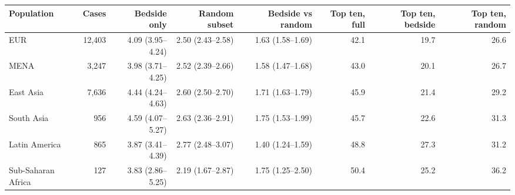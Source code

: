 \begin{tabular}{lrrrrrrr}
\toprule
Population & Cases & Bedside only & Random subset & Bedside vs random & Top ten, full & Top ten, bedside & Top ten, random \\
\midrule
EUR & 12,403 & 4.09 (3.95--4.24) & 2.50 (2.43--2.58) & 1.63 (1.58--1.69) & 42.1 & 19.7 & 26.6 \\
MENA & 3,247 & 3.98 (3.71--4.25) & 2.52 (2.39--2.66) & 1.58 (1.47--1.68) & 43.0 & 20.1 & 26.7 \\
East Asia & 7,636 & 4.44 (4.24--4.63) & 2.60 (2.50--2.70) & 1.71 (1.63--1.79) & 45.9 & 21.4 & 29.2 \\
South Asia & 956 & 4.59 (4.07--5.27) & 2.63 (2.36--2.91) & 1.75 (1.53--1.99) & 45.7 & 22.6 & 31.3 \\
Latin America & 865 & 3.87 (3.41--4.39) & 2.77 (2.48--3.07) & 1.40 (1.24--1.59) & 48.8 & 27.3 & 31.2 \\
Sub-Saharan Africa & 127 & 3.83 (2.86--5.25) & 2.19 (1.67--2.87) & 1.75 (1.25--2.50) & 50.4 & 25.2 & 36.2 \\
\bottomrule
\end{tabular}
